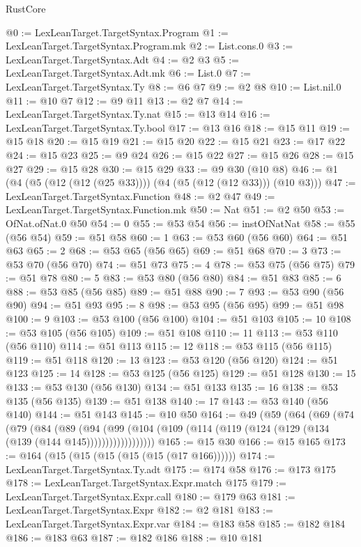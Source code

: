 \begin{lexlean}{RustCore}
\begin{coremodule}
@0 := LexLeanTarget.TargetSyntax.Program
@1 := LexLeanTarget.TargetSyntax.Program.mk
@2 := List.cons.{0}
@3 := LexLeanTarget.TargetSyntax.Adt
@4 := @2 @3
@5 := LexLeanTarget.TargetSyntax.Adt.mk
@6 := List.{0}
@7 := LexLeanTarget.TargetSyntax.Ty
@8 := @6 @7
@9 := @2 @8
@10 := List.nil.{0}
@11 := @10 @7
@12 := @9 @11
@13 := @2 @7
@14 := LexLeanTarget.TargetSyntax.Ty.nat
@15 := @13 @14
@16 := LexLeanTarget.TargetSyntax.Ty.bool
@17 := @13 @16
@18 := @15 @11
@19 := @15 @18
@20 := @15 @19
@21 := @15 @20
@22 := @15 @21
@23 := @17 @22
@24 := @15 @23
@25 := @9 @24
@26 := @15 @22
@27 := @15 @26
@28 := @15 @27
@29 := @15 @28
@30 := @15 @29
@33 := @9 @30 (@10 @8)
@46 := @1 (@4 (@5 (@12 (@12 (@25 @33)))) (@4 (@5 (@12 (@12 @33))) (@10 @3)))
@47 := LexLeanTarget.TargetSyntax.Function
@48 := @2 @47
@49 := LexLeanTarget.TargetSyntax.Function.mk
@50 := Nat
@51 := @2 @50
@53 := OfNat.ofNat.{0} @50
@54 := 0
@55 := @53 @54
@56 := instOfNatNat
@58 := @55 (@56 @54)
@59 := @51 @58
@60 := 1
@63 := @53 @60 (@56 @60)
@64 := @51 @63
@65 := 2
@68 := @53 @65 (@56 @65)
@69 := @51 @68
@70 := 3
@73 := @53 @70 (@56 @70)
@74 := @51 @73
@75 := 4
@78 := @53 @75 (@56 @75)
@79 := @51 @78
@80 := 5
@83 := @53 @80 (@56 @80)
@84 := @51 @83
@85 := 6
@88 := @53 @85 (@56 @85)
@89 := @51 @88
@90 := 7
@93 := @53 @90 (@56 @90)
@94 := @51 @93
@95 := 8
@98 := @53 @95 (@56 @95)
@99 := @51 @98
@100 := 9
@103 := @53 @100 (@56 @100)
@104 := @51 @103
@105 := 10
@108 := @53 @105 (@56 @105)
@109 := @51 @108
@110 := 11
@113 := @53 @110 (@56 @110)
@114 := @51 @113
@115 := 12
@118 := @53 @115 (@56 @115)
@119 := @51 @118
@120 := 13
@123 := @53 @120 (@56 @120)
@124 := @51 @123
@125 := 14
@128 := @53 @125 (@56 @125)
@129 := @51 @128
@130 := 15
@133 := @53 @130 (@56 @130)
@134 := @51 @133
@135 := 16
@138 := @53 @135 (@56 @135)
@139 := @51 @138
@140 := 17
@143 := @53 @140 (@56 @140)
@144 := @51 @143
@145 := @10 @50
@164 := @49
    (@59
      (@64
        (@69
          (@74
            (@79
              (@84
                (@89
                  (@94
                    (@99
                      (@104 (@109 (@114 (@119 (@124 (@129 (@134 (@139 (@144 @145))))))))))))))))))
@165 := @15 @30
@166 := @15 @165
@173 := @164 (@15 (@15 (@15 (@15 (@15 (@17 @166))))))
@174 := LexLeanTarget.TargetSyntax.Ty.adt
@175 := @174 @58
@176 := @173 @175
@178 := LexLeanTarget.TargetSyntax.Expr.match @175
@179 := LexLeanTarget.TargetSyntax.Expr.call
@180 := @179 @63
@181 := LexLeanTarget.TargetSyntax.Expr
@182 := @2 @181
@183 := LexLeanTarget.TargetSyntax.Expr.var
@184 := @183 @58
@185 := @182 @184
@186 := @183 @63
@187 := @182 @186
@188 := @10 @181

\end{coremodule}
\end{lexlean}
